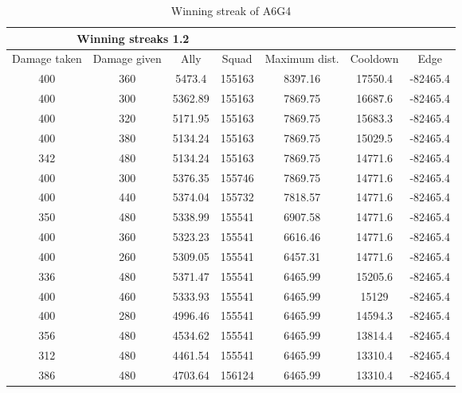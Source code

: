 \begin{centering}
\begin{table}
 \begin{tabular}{|c|c|c|c|c|c|c|}
	\multicolumn{4}{c}{Winning streaks 1.2} \\
	\hline
	Damage taken & Damage given & Ally & Squad & Maximum dist. & Cooldown & Edge \\
	\hline
	400&		360&			5473.4&	 155163&	8397.16&		17550.4&	-82465.4\\
	400&		300&			5362.89& 155163&	7869.75&		16687.6&	-82465.4\\
	400&		320&			5171.95& 155163&	7869.75&		15683.3&	-82465.4\\
	400&		380&			5134.24& 155163&	7869.75&		15029.5&	-82465.4\\
	342&		480&			5134.24& 155163&	7869.75&		14771.6&	-82465.4\\
	400&		300&			5376.35& 155746&	7869.75&		14771.6&	-82465.4\\
	400&		440&			5374.04& 155732&	7818.57&		14771.6&	-82465.4\\
	350&		480&			5338.99& 155541&	6907.58&		14771.6&	-82465.4\\
	400&		360&			5323.23& 155541&	6616.46&		14771.6&	-82465.4\\
	400&		260&			5309.05& 155541&	6457.31&		14771.6&	-82465.4\\
	336&		480&			5371.47& 155541&	6465.99&		15205.6&	-82465.4\\
	400&		460&			5333.93& 155541&	6465.99&		15129& 		-82465.4\\
	400&		280&			4996.46& 155541&	6465.99&		14594.3&	-82465.4\\
	356&		480&			4534.62& 155541&	6465.99&		13814.4&	-82465.4\\
	312&		480&			4461.54& 155541&	6465.99&		13310.4&	-82465.4\\
	386&		480&			4703.64& 156124&	6465.99&		13310.4&	-82465.4\\
	\hline
\end{tabular}
\caption{Winning streak of A6G4}
	\label{winning_streak_2.2}
	\end{table}
\end{centering}














